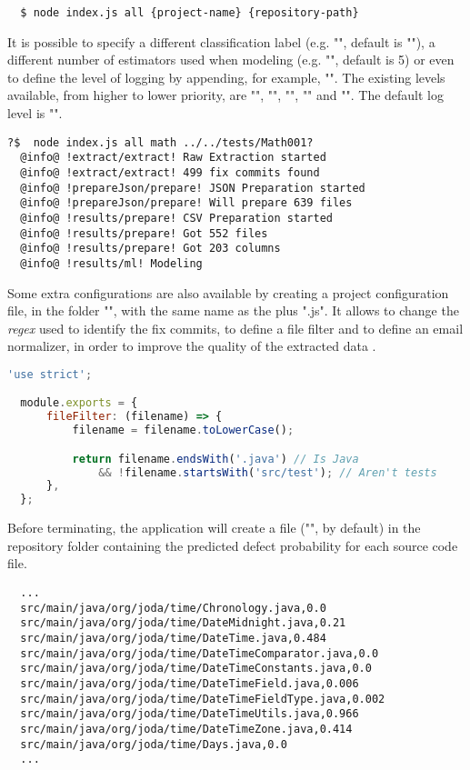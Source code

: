 \begin{lstlisting}
  $ node index.js all {project-name} {repository-path}
\end{lstlisting}

It is possible to specify a different classification label (e.g. "", default is ""),
a different number of estimators used when modeling (e.g. "", default is 5) or even
to define the level of logging by appending, for example, "". The existing levels available, from higher to lower priority, are
"", "", "", "" and "". The default log level is "".

\begin{lstlisting}[style=npmlog]
  ?$  node index.js all math ../../tests/Math001?
  @info@ !extract/extract! Raw Extraction started
  @info@ !extract/extract! 499 fix commits found
  @info@ !prepareJson/prepare! JSON Preparation started
  @info@ !prepareJson/prepare! Will prepare 639 files
  @info@ !results/prepare! CSV Preparation started
  @info@ !results/prepare! Got 552 files
  @info@ !results/prepare! Got 203 columns
  @info@ !results/ml! Modeling
\end{lstlisting}

Some extra configurations are also available by creating a project configuration file, in the folder "", with the same name as the  plus ".js".
It allows to change the \emph{regex} used to identify the fix commits, to define a file filter and to define an email normalizer, in order to improve the quality of the extracted data .

\begin{lstlisting}[language=Javascript]
  'use strict';

  module.exports = {
      fileFilter: (filename) => {
          filename = filename.toLowerCase();

          return filename.endsWith('.java') // Is Java
              && !filename.startsWith('src/test'); // Aren't tests
      },
  };
\end{lstlisting}

Before terminating, the application will create a file ("", by default) in the repository folder containing the predicted defect probability for each source code file.

\begin{lstlisting}
  ...
  src/main/java/org/joda/time/Chronology.java,0.0
  src/main/java/org/joda/time/DateMidnight.java,0.21
  src/main/java/org/joda/time/DateTime.java,0.484
  src/main/java/org/joda/time/DateTimeComparator.java,0.0
  src/main/java/org/joda/time/DateTimeConstants.java,0.0
  src/main/java/org/joda/time/DateTimeField.java,0.006
  src/main/java/org/joda/time/DateTimeFieldType.java,0.002
  src/main/java/org/joda/time/DateTimeUtils.java,0.966
  src/main/java/org/joda/time/DateTimeZone.java,0.414
  src/main/java/org/joda/time/Days.java,0.0
  ...
\end{lstlisting}

